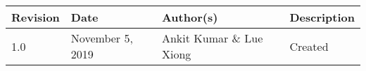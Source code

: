 \begin{tabular}{p{}p{}p{}p{}}
\textbf{Revision} & \textbf{Date} & \textbf{Author(s)} & \textbf{Description} \\
\hline
1.0 & November 5, 2019 & Ankit Kumar \& Lue Xiong & Created \\
\end{tabular}